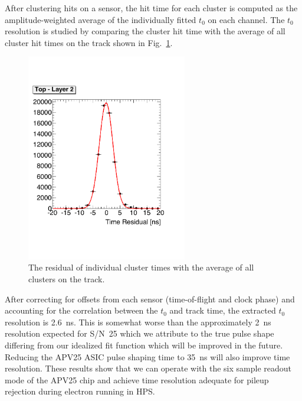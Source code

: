 \documentclass[final,3p,times,twocolumn]{elsarticle}
\begin{document}
After clustering hits on a sensor, the hit time for each cluster is computed 
as the amplitude-weighted average of the individually fitted $t_0$ on each channel. The 
$t_0$ resolution is studied by comparing the cluster hit time with the average of all cluster hit times on 
the track shown in Fig.~\ref{fig:tracktime}. 
\begin{figure}[]
\begin{center}
{\small
	\includegraphics[width=7cm]{figures/test_run_1351_hit_time_corrected_top_layer2_mod.pdf}
	\caption{
	The residual of individual cluster times with the average of all clusters on the track. }
	\label{fig:tracktime}
}
\end{center}
\end{figure}
After correcting for offsets from each sensor (time-of-flight and clock phase) and accounting for the 
correlation between the $t_0$ and track time,  the extracted $t_0$ resolution is 2.6~ns. This is 
somewhat worse than the approximately 2~ns resolution expected for S/N~25 which we attribute to the 
true pulse shape differing from our idealized fit function which will be improved in the future. Reducing 
the APV25 ASIC pulse shaping time to 35~ns will also improve time resolution. 
These results show that we can operate with the six sample readout mode of the APV25 chip and 
achieve time resolution adequate for pileup rejection during electron running in HPS. 
\end{document}
